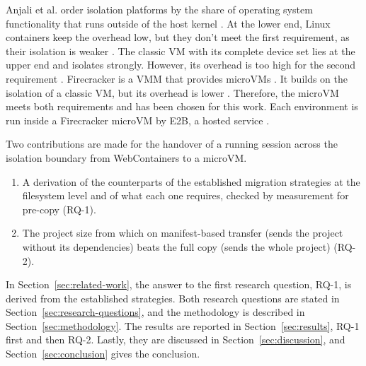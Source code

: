 Anjali et al. order isolation platforms by the share of operating system functionality that runs outside of the host kernel \cite{anjali2020blending}.
At the lower end, Linux containers keep the overhead low, but they don't meet the first requirement, as their isolation is weaker \cite{agache2020firecracker}.
The classic \ac{VM} with its complete device set lies at the upper end and isolates strongly. However, its overhead is too high for the second requirement \cite{agache2020firecracker}.
Firecracker is a \ac{VMM} that provides microVMs \cite{agache2020firecracker}. It builds on the isolation of a classic \ac{VM}, but its overhead is lower \cite{anjali2020blending,agache2020firecracker}. 
Therefore, the microVM meets both requirements and has been chosen for this work. Each environment is run inside a Firecracker microVM by E2B, a hosted service \cite{e2b-security-2026}.

Two contributions are made for the handover of a running session across the isolation boundary from WebContainers to a microVM.
\begin{enumerate}
\item A derivation of the counterparts of the established migration strategies at the filesystem level and of what each one requires, checked by measurement for pre-copy (RQ-1).
\item The project size from which on manifest-based transfer (sends the project without its dependencies) beats the full copy (sends the whole project) (RQ-2).
\end{enumerate}

In Section~\ref{sec:related-work}, the answer to the first research question, RQ-1, is derived from the established strategies. Both research questions are stated in Section~\ref{sec:research-questions}, and the methodology is described in Section~\ref{sec:methodology}. The results are reported in Section~\ref{sec:results}, RQ-1 first and then RQ-2. Lastly, they are discussed in Section~\ref{sec:discussion}, and Section~\ref{sec:conclusion} gives the conclusion.
